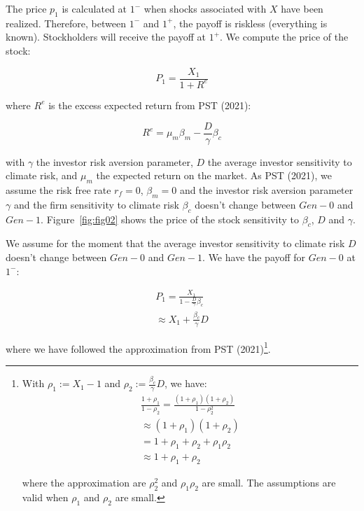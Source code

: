 The price $p_1$ is calculated at $1^{-}$ when
shocks associated with $X$ 
have been realized. Therefore, 
between $1^{-}$ and $1^{+}$, the payoff is
riskless (everything is known).
Stockholders will 
receive the payoff at $1^{+}$.
We compute the price of the stock:

\begin{equation}
    P_1 = \frac{X_1}{1 + R^e}
\end{equation}

where $R^e$ is the excess expected return 
from PST (2021):

\begin{equation}
    R^e = \mu_m \beta_m - \frac{D}{\gamma} \beta_{c}
\end{equation}

with $\gamma$ the investor risk aversion parameter,
$D$ the average investor sensitivity to climate risk,
and $\mu_m$ the expected return on the market.
As PST (2021), we assume the 
risk free rate $r_f = 0$, $\beta_m = 0$ and the investor 
risk aversion parameter $\gamma$ and the 
firm sensitivity to climate risk $\beta_{c}$
doesn't change between $Gen-0$ and $Gen-1$.
Figure~\ref{fig:fig02} shows the price of the stock 
sensitivity to $\beta_{c}$, $D$ and $\gamma$.


We assume for the moment that the average 
investor sensitivity to climate risk $D$ 
doesn't change between $Gen-0$ and $Gen-1$.
We have the payoff for $Gen-0$ at $1^{-}$:

\begin{equation}
    \begin{aligned}
    P_1 = \frac{X_1}{1 - \frac{D}{\gamma} \beta_{c}} \\
    \approx X_1 + \frac{\beta_{c}}{\gamma}D
    \end{aligned}
\end{equation}

where we have followed the approximation
from PST (2021)\footnote{
With $\rho_1 := X_1 - 1$ and $\rho_2 := \frac{\beta_{c}}{\gamma}D$,
we have:
\begin{equation}
    \begin{aligned}
        \frac{1 + \rho_1}{1 - \rho_2} = \frac{(1 + \rho_1)(1 + \rho_2)}{1 - \rho_2^2} \\
        \approx (1 + \rho_1)(1 + \rho_2) \\
        = 1 + \rho_1 + \rho_2 + \rho_1 \rho_2 \\
        \approx 1 + \rho_1 + \rho_2
    \end{aligned}
\end{equation}

where the approximation are $\rho^2_2$ and $\rho_1 \rho_2$ are small.
The assumptions are valid when $\rho_1$ and $\rho_2$ are small.
}.


